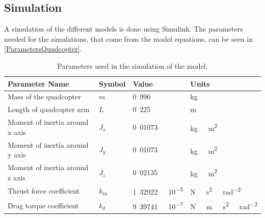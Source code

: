 \subsection{Simulation}
A simulation of the different models is done using Simulink. The parameters needed for the simulations, that come from the model equations, can be seen in \autoref{ParametersQuadcopter}.
\begin{table}[H]
	\centering
	\begin{tabular}{|l|l|l|l|}
		\hline %
		\textbf{Parameter Name}         &\textbf{Symbol} &\textbf{Value}          &\textbf{Units}             \\
		\hline %
		Mass of the quadcopter          & $m$            & \si{0.996}             & \si{kg}                   \\
		\hline %
    Length of quadcopter arm        & $L$            & \si{0.225}             & \si{m}                    \\
    \hline %
		Moment of inertia around x axis & $J_x$          & \si{0.01073}           & \si{kg\ m^2}              \\
		\hline %
		Moment of inertia around y axis & $J_y$          & \si{0.01073}           & \si{kg\ m^2}              \\
		\hline %
		Moment of inertia around z axis & $J_z$          & \si{0.02135}           & \si{kg\ m^2}              \\
		\hline %
		Thrust force coefficient        & $k_{th}$       & \si{1.32922\ 10^{-5}}  & \si{N\ s^2\ rad^{-2}}     \\
		\hline %
		Drag torque coefficient         & $k_{d}$        & \si{9.39741\ 10^{-7}}  & \si{N\ m\  s^2\ rad^{-2}} \\
		\hline %
	\end{tabular}
	\caption{Parameters used in the simulation of the model.}
	\label{ParametersQuadcopter}
\end{table}\vspace{-18pt}

